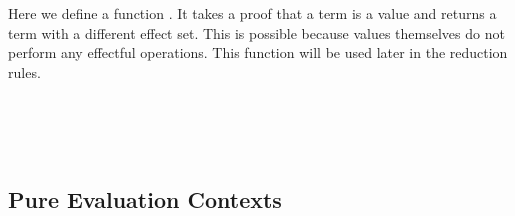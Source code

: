\documentclass[a4paper,11pt]{article}
\newcommand\fun[1]{{\AgdaFunction{#1}}}
\begin{document}
Here we define a function \fun{coe}. It takes a proof that a term is a value and returns a term with a different effect set. This is possible because values themselves do not perform any effectful operations. This function will be used later in the reduction rules.
\begin{code}%
%
\>[2]\AgdaSpace{}%
\AgdaSymbol{:}\AgdaSpace{}%
\AgdaSymbol{\{}\AgdaSpace{}%
\AgdaSymbol{:}\AgdaSpace{}%
\AgdaSpace{}%
\AgdaSpace{}%
\AgdaSpace{}%
\AgdaSymbol{\}}\AgdaSpace{}%
\AgdaSpace{}%
\AgdaSpace{}%
\AgdaSpace{}%
\AgdaSpace{}%
\AgdaSpace{}%
\AgdaSpace{}%
\AgdaSpace{}%
\<%
\\
%
\>[2]\AgdaSpace{}%
\AgdaSymbol{(}\AgdaSpace{}%
\AgdaSymbol{)}\AgdaSpace{}%
\AgdaSymbol{=}\AgdaSpace{}%
\AgdaSpace{}%
\<%
\\
%
\>[2]\AgdaSpace{}%
\AgdaSpace{}%
\AgdaSymbol{=}\AgdaSpace{}%
\<%
\\
%
\>[2]\AgdaSpace{}%
\AgdaSymbol{(}\AgdaSpace{}%
\AgdaSymbol{)}\AgdaSpace{}%
\AgdaSymbol{=}\AgdaSpace{}%
\AgdaSpace{}%
\AgdaSymbol{(}\AgdaSpace{}%
\AgdaSymbol{)}\<%
\end{code}

\subsection{Pure Evaluation Contexts}
\end{document}
